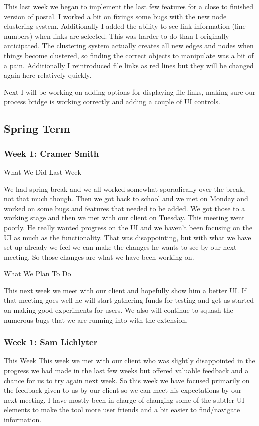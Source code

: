 This last week we began to implement the last few features for a close to finished version of postal. I worked a bit on fixings some bugs with the new node clustering system. Additionally I added the ability to see link information (line numbers) when links are selected. This was harder to do than I originally anticipated. The clustering system actually creates all new edges and nodes when things become clustered, so finding the correct objects to manipulate was a bit of a pain. Additionally I reintroduced file links as red lines but they will be changed again here relatively quickly.

Next I will be working on adding options for displaying file links, making sure our process bridge is working correctly and adding a couple of UI controls.

\subsection{Spring Term}
\subsubsection{Week 1: Cramer Smith}

What We Did Last Week

We had spring break and we all worked somewhat sporadically over the break, not that much though. Then we got back to school and we met on Monday and worked on some bugs and features that needed to be added. We got those to a working stage and then we met with our client on Tuesday. This meeting went poorly. He really wanted progress on the UI and we haven't been focusing on the UI as much as the functionality. That was disappointing, but with what we have set up already we feel we can make the changes he wants to see by our next meeting. So those changes are what we have been working on.

What We Plan To Do 

This next week we meet with our client and hopefully show him a better UI. If that meeting goes well he will start gathering funds for testing and get us started on making good experiments for users. We also will continue to squash the numerous bugs that we are running into with the extension.

\subsubsection{Week 1: Sam Lichlyter}

This Week
This week we met with our client who was slightly disappointed in the progress we had made in the last few weeks but offered valuable feedback and a chance for us to try again next week. So this week we have focused primarily on the feedback given to us by our client so we can meet his expectations by our next meeting. I have mostly been in charge of changing some of the subtler UI elements to make the tool more user friends and a bit easier to find/navigate information.

